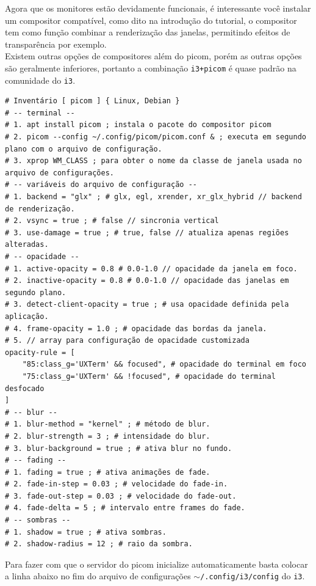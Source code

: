 \documentclass[12pt,a4paper]{article}
\begin{document}
\vspace{\baselineskip}

Agora que os monitores estão devidamente funcionais, é interessante você instalar um compositor compatível, como dito na introdução do tutorial, o compositor tem como função combinar a renderização das janelas, permitindo efeitos de transparência por exemplo. \\

Existem outras opções de compositores além do picom, porém as outras opções são geralmente inferiores, portanto a combinação \texttt{i3+picom} é quase padrão na comunidade do \texttt{i3}. \\

\begin{lstlisting}
# Inventário [ picom ] { Linux, Debian }
# -- terminal -- 
# 1. apt install picom ; instala o pacote do compositor picom 
# 2. picom --config ~/.config/picom/picom.conf & ; executa em segundo plano com o arquivo de configuração.
# 3. xprop WM_CLASS ; para obter o nome da classe de janela usada no arquivo de configurações.
# -- variáveis do arquivo de configuração -- 
# 1. backend = "glx" ; # glx, egl, xrender, xr_glx_hybrid // backend de renderização.
# 2. vsync = true ; # false // sincronia vertical 
# 3. use-damage = true ; # true, false // atualiza apenas regiões alteradas.
# -- opacidade --
# 1. active-opacity = 0.8 # 0.0-1.0 // opacidade da janela em foco.
# 2. inactive-opacity = 0.8 # 0.0-1.0 // opacidade das janelas em segundo plano.
# 3. detect-client-opacity = true ; # usa opacidade definida pela aplicação.
# 4. frame-opacity = 1.0 ; # opacidade das bordas da janela.
# 5. // array para configuração de opacidade customizada
opacity-rule = [
	"85:class_g='UXTerm' && focused", # opacidade do terminal em foco 
    "75:class_g='UXTerm' && !focused", # opacidade do terminal desfocado
] 
# -- blur --
# 1. blur-method = "kernel" ; # método de blur.
# 2. blur-strength = 3 ; # intensidade do blur.
# 3. blur-background = true ; # ativa blur no fundo.
# -- fading -- 
# 1. fading = true ; # ativa animações de fade.
# 2. fade-in-step = 0.03 ; # velocidade do fade-in.
# 3. fade-out-step = 0.03 ; # velocidade do fade-out.
# 4. fade-delta = 5 ; # intervalo entre frames do fade.
# -- sombras -- 
# 1. shadow = true ; # ativa sombras.
# 2. shadow-radius = 12 ; # raio da sombra.
\end{lstlisting}

\vspace{\baselineskip}

Para fazer com que o servidor do picom inicialize automaticamente basta colocar a linha abaixo no fim do arquivo de configurações \texttt{$\sim$/.config/i3/config} do \texttt{i3}.\\
\end{document}
